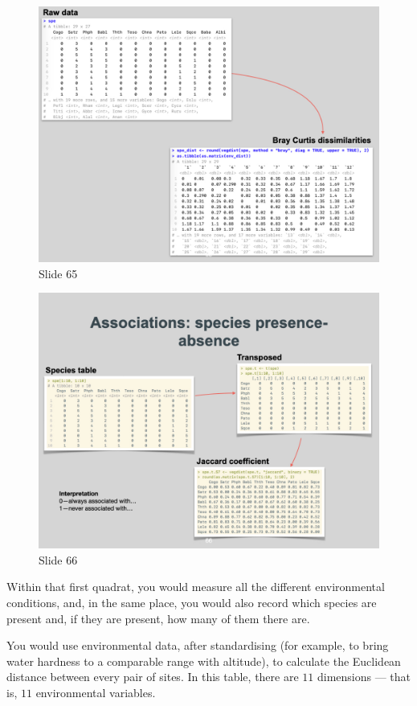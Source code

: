 \documentclass[
  11pt,
]{book}
\begin{document}
\begin{figure}[ht]
\centering
\includegraphics[width=0.8\linewidth]{../images/BDC334/BDC334-065.jpeg}
\caption*{Slide 65}
\end{figure}

\begin{figure}[ht]
\centering
\includegraphics[width=0.8\linewidth]{../images/BDC334/BDC334-066.jpeg}
\caption*{Slide 66}
\end{figure}

Within that first quadrat, you would measure all the different
environmental conditions, and, in the same place, you would also record
which species are present and, if they are present, how many of them
there are.

You would use environmental data, after standardising (for example, to
bring water hardness to a comparable range with altitude), to calculate
the Euclidean distance between every pair of sites. In this table, there
are \(11\) dimensions --- that is, \(11\) environmental variables.
\end{document}
